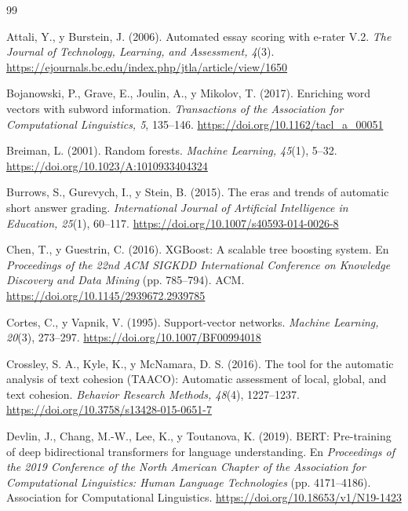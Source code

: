 \documentclass[11pt,a4paper]{article}
\begin{document}
\begin{thebibliography}{99}

Attali, Y., y Burstein, J. (2006). Automated essay scoring with e-rater V.2. \textit{The Journal of Technology, Learning, and Assessment, 4}(3). \url{https://ejournals.bc.edu/index.php/jtla/article/view/1650}

Bojanowski, P., Grave, E., Joulin, A., y Mikolov, T. (2017). Enriching word vectors with subword information. \textit{Transactions of the Association for Computational Linguistics, 5}, 135--146. \url{https://doi.org/10.1162/tacl_a_00051}

Breiman, L. (2001). Random forests. \textit{Machine Learning, 45}(1), 5--32. \url{https://doi.org/10.1023/A:1010933404324}

Burrows, S., Gurevych, I., y Stein, B. (2015). The eras and trends of automatic short answer grading. \textit{International Journal of Artificial Intelligence in Education, 25}(1), 60--117. \url{https://doi.org/10.1007/s40593-014-0026-8}

Chen, T., y Guestrin, C. (2016). XGBoost: A scalable tree boosting system. En \textit{Proceedings of the 22nd ACM SIGKDD International Conference on Knowledge Discovery and Data Mining} (pp. 785--794). ACM. \url{https://doi.org/10.1145/2939672.2939785}

Cortes, C., y Vapnik, V. (1995). Support-vector networks. \textit{Machine Learning, 20}(3), 273--297. \url{https://doi.org/10.1007/BF00994018}

Crossley, S. A., Kyle, K., y McNamara, D. S. (2016). The tool for the automatic analysis of text cohesion (TAACO): Automatic assessment of local, global, and text cohesion. \textit{Behavior Research Methods, 48}(4), 1227--1237. \url{https://doi.org/10.3758/s13428-015-0651-7}

Devlin, J., Chang, M.-W., Lee, K., y Toutanova, K. (2019). BERT: Pre-training of deep bidirectional transformers for language understanding. En \textit{Proceedings of the 2019 Conference of the North American Chapter of the Association for Computational Linguistics: Human Language Technologies} (pp. 4171--4186). Association for Computational Linguistics. \url{https://doi.org/10.18653/v1/N19-1423}


\end{thebibliography}
\end{document}
